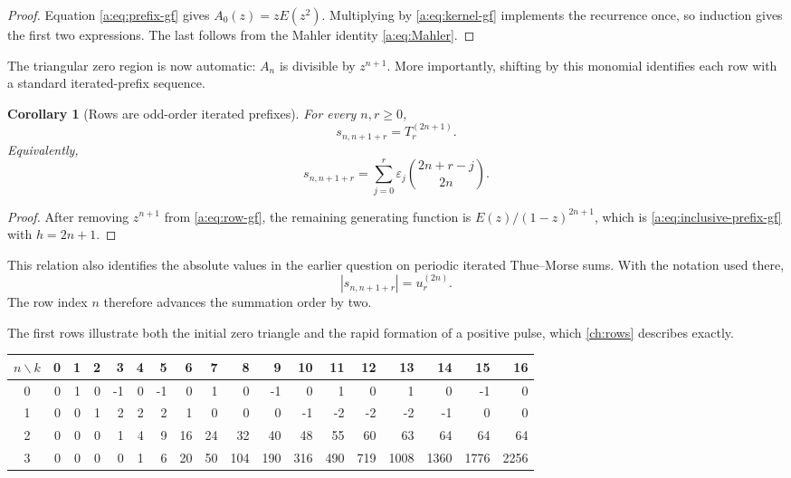 \documentclass[11pt,a4paper,oneside,openany]{book}
\numberwithin{equation}{chapter}
\newtheorem{corollary}[theorem]{Corollary}
\theoremstyle{definition}
\theoremstyle{remark}
\newcommand{\eps}{\varepsilon}
\newcommand{\Prefix}{T}
\begin{document}
\begin{proof}
Equation \eqref{a:eq:prefix-gf} gives \(A_0(z)=zE(z^2)\).  Multiplying by
\eqref{a:eq:kernel-gf} implements the recurrence once, so induction gives the
first two expressions.  The last follows from the Mahler identity
\eqref{a:eq:Mahler}.
\end{proof}

The triangular zero region is now automatic: \(A_n\) is divisible by
\(z^{n+1}\).  More importantly, shifting by this monomial identifies each row
with a standard iterated-prefix sequence.

\begin{corollary}[Rows are odd-order iterated prefixes]
For every \(n,r\ge0\),
\begin{equation}
 \boxed{s_{n,n+1+r}=\Prefix_r^{(2n+1)}.}
 \label{a:eq:row-prefix-identification}
\end{equation}
Equivalently,
\begin{equation}
 s_{n,n+1+r}
 =\sum_{j=0}^{r}\eps_j\binom{2n+r-j}{2n}.
 \label{a:eq:row-prefix-convolution}
\end{equation}
\end{corollary}

\begin{proof}
After removing \(z^{n+1}\) from \eqref{a:eq:row-gf}, the remaining generating
function is \(E(z)/(1-z)^{2n+1}\), which is
\eqref{a:eq:inclusive-prefix-gf} with \(h=2n+1\).
\end{proof}

This relation also identifies the absolute values in the earlier question on
periodic iterated Thue--Morse sums.  With the notation used there,
\begin{equation}
 |s_{n,n+1+r}|=u_r^{(2n)}.
 \label{a:eq:mathse-map}
\end{equation}
The row index \(n\) therefore advances the summation order by two.

The first rows illustrate both the initial zero triangle and the rapid
formation of a positive pulse, which \cref{ch:rows} describes exactly.

\begin{center}
\small
\setlength{\tabcolsep}{3.6pt}
\begin{tabular}{c|rrrrrrrrrrrrrrrrr}
\toprule
\(n\backslash k\)&0&1&2&3&4&5&6&7&8&9&10&11&12&13&14&15&16\\
\midrule
0&0&1&0&-1&0&-1&0&1&0&-1&0&1&0&1&0&-1&0\\
1&0&0&1&2&2&2&1&0&0&0&-1&-2&-2&-2&-1&0&0\\
2&0&0&0&1&4&9&16&24&32&40&48&55&60&63&64&64&64\\
3&0&0&0&0&1&6&20&50&104&190&316&490&719&1008&1360&1776&2256\\
\bottomrule
\end{tabular}
\end{center}
\end{document}
